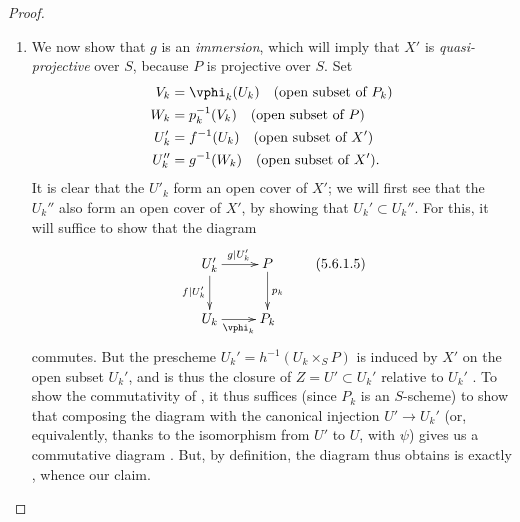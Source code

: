 \begin{proof}
\begin{enumerate}
  \item[(D)] We now show that $g$ is an \emph{immersion}, which will imply that $X'$ is \emph{quasi-projective} over $S$, because $P$ is projective over $S$.
    Set
    \begin{align*}
      V_k  &=\vphi_k(U_k) \quad(\text{open subset of }P_k)\\
      W_k  &=p_k^{-1}(V_k)\quad(\text{open subset of }P)\\
      U_k' &=f^{-1}(U_k)  \quad(\text{open subset of }X')\\
      U_k''&=g^{-1}(W_k)  \quad(\text{open subset of }X').
    \end{align*}
    It is clear that the $U'_k$ form an open cover of $X'$; we will first see that the $U_k''$ also form an open cover of $X'$, by showing that $U_k'\subset U_k''$.
    For this, it will suffice to show that the diagram
    \[
    \label{II.5.6.1.5}
      \xymatrix{
        U_k'\ar[r]^{g|U_k'}\ar[d]_{f|U_k'} &
        P\ar[d]^{p_k}\\
        U_k\ar[r]_{\vphi_k} &
        P_k
      }
      \tag{5.6.1.5}
    \]
    commutes.
    But the prescheme $U_k'=h^{-1}(U_k\times_S P)$ is induced by $X'$ on the open subset $U_k'$, and is thus the closure of $Z=U'\subset U_k'$ relative to $U_k'$ .
    To show the commutativity of , it thus suffices (since $P_k$ is an $S$-scheme) to show that composing the diagram with the canonical injection $U'\to U_k'$ (or, equivalently, thanks to the isomorphism from $U'$ to $U$, with $\psi$) gives us a commutative diagram .
    But, by definition, the diagram thus obtains is exactly , whence our claim.


\end{enumerate}
\end{proof}
